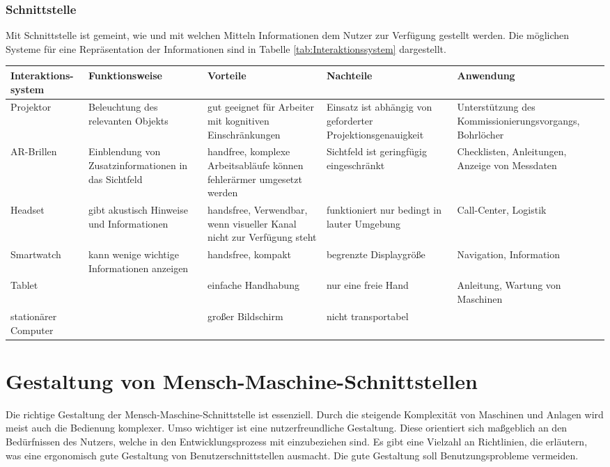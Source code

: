 \subsubsection*{Schnittstelle}
Mit Schnittstelle ist gemeint, wie und mit welchen Mitteln Informationen dem Nutzer zur Verfügung gestellt werden. Die möglichen Systeme für eine Repräsentation der Informationen sind in Tabelle \ref{tab:Interaktionssystem} dargestellt. \cite{}

\begin{sidewaystable}[ph!]
\begin{tabular}{p{}|p{}|p{}|p{}|p{}}
	\textbf{Interaktions-system} & \textbf{Funktionsweise} & \textbf{Vorteile} & \textbf{Nachteile} & \textbf{Anwendung} \\
	\hline
	Projektor & Beleuchtung des relevanten Objekts & gut geeignet für Arbeiter mit kognitiven Einschränkungen & Einsatz ist abhängig von geforderter Projektionsgenauigkeit & Unterstützung des Kommissionierungsvorgangs, Bohrlöcher \\
	\hline
	AR-Brillen & Einblendung von Zusatzinformationen in das Sichtfeld & handfree, komplexe Arbeitsabläufe können fehlerärmer umgesetzt werden & Sichtfeld ist geringfügig eingeschränkt & Checklisten, Anleitungen, Anzeige von Messdaten \\
	\hline
	Headset & gibt akustisch Hinweise und Informationen & handsfree, Verwendbar, wenn visueller Kanal nicht zur Verfügung steht & funktioniert nur bedingt in lauter Umgebung & Call-Center, Logistik \\
	\hline
	Smartwatch & kann wenige wichtige Informationen anzeigen & handsfree, kompakt & begrenzte Displaygröße & Navigation, Information \\
	\hline
	Tablet & & einfache Handhabung & nur eine freie Hand & Anleitung, Wartung von Maschinen\\
	\hline
	stationärer Computer & & großer Bildschirm & nicht transportabel & \\
\end{tabular}
\label{tab:Interaktionssystem}
\caption{Interaktionssysteme zur Bereitstellung von Informationen}
\end{sidewaystable}

\section{Gestaltung von Mensch-Maschine-Schnittstellen}
Die richtige Gestaltung der Mensch-Maschine-Schnittstelle ist essenziell. Durch die steigende Komplexität von Maschinen und Anlagen wird meist auch die Bedienung komplexer. Umso wichtiger ist eine nutzerfreundliche Gestaltung. Diese orientiert sich maßgeblich an den Bedürfnissen des Nutzers, welche in den Entwicklungsprozess mit einzubeziehen sind. Es gibt eine Vielzahl an Richtlinien, die erläutern, was eine ergonomisch gute Gestaltung von Benutzerschnittstellen ausmacht. Die gute Gestaltung soll Benutzungsprobleme vermeiden.

